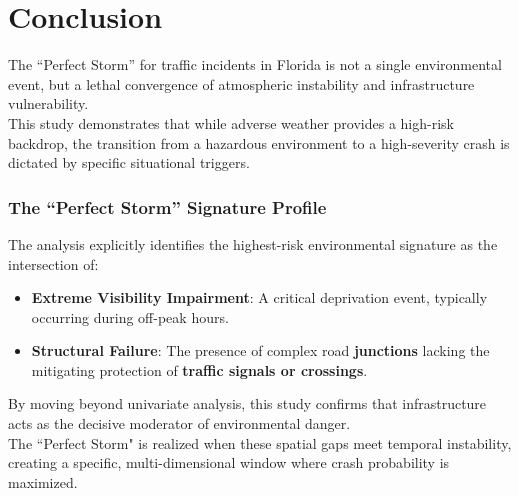 \documentclass[conference]{IEEEtran}
\begin{document}
\vspace{8mm}

\section{\textbf{Conclusion}}

The ``Perfect Storm'' for traffic incidents in Florida is not a single environmental event, but a lethal convergence of atmospheric instability and infrastructure vulnerability.\\
\indent This study demonstrates that while adverse weather provides a high-risk backdrop, the transition from a hazardous environment to a high-severity crash is dictated by specific situational triggers.

\subsubsection*{\textbf{The ``Perfect Storm'' Signature Profile}}
The analysis explicitly identifies the highest-risk environmental signature as the intersection of:
\begin{itemize}
	\item \textbf{Extreme Visibility Impairment}: A critical deprivation event, typically occurring during off-peak hours.
	\item \textbf{Structural Failure}: The presence of complex road \textbf{junctions} lacking the mitigating protection of \textbf{traffic signals or crossings}.
\end{itemize}

By moving beyond univariate analysis, this study confirms that infrastructure acts as the decisive moderator of environmental danger.\\
\indent The ``Perfect Storm" is realized when these spatial gaps meet temporal instability, creating a specific, multi-dimensional window where crash probability is maximized.
\end{document}
